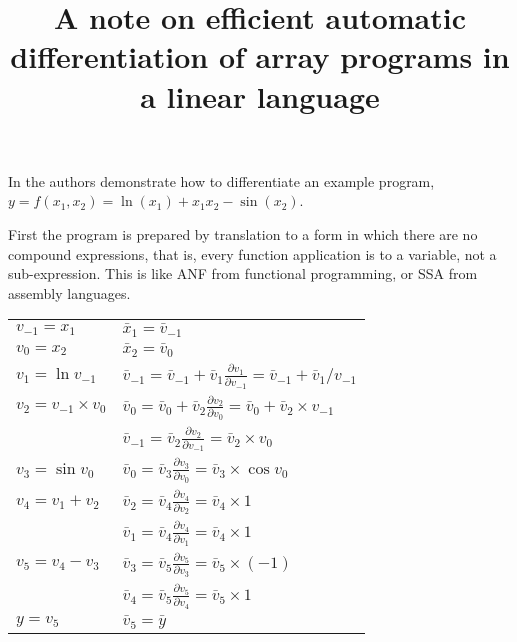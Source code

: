 \documentclass[12pt]{article}
\title{A note on efficient automatic differentiation of array programs
  in a linear language}
\begin{document}
\maketitle

In \cite{adml} the authors demonstrate how to differentiate an example
program, $y = f(x_1, x_2) = \ln(x_1)+x_1 x_2-\sin(x_2)$.

First the program is prepared by translation to a form in which there
are no compound expressions, that is, every function application is to
a variable, not a sub-expression.  This is like ANF from functional
programming, or SSA from assembly languages.

  \newcommand{\diff}[2]{
    \bar{v}_{#1} \frac{\partial v_{#1}}{\partial v_{#2}}
  }

\begin{tabular}[t]{ll}

  $v_{-1} = x_1$
  &
  $\bar{x}_1 = \bar{v}_{-1}$
  \\
  
  $v_{0} = x_2$
  &
  $\bar{x}_2 = \bar{v}_{0}$
  \\

  $v_1 = \ln{v_{-1}}$
  &
  \(\bar{v}_{-1}
  = \bar{v}_{-1} + \diff{1}{-1}
  = \bar{v}_{-1} + \bar{v}_1 / v_{-1}
  \) \\

  $v_2 = v_{-1} \times v_0$
  &
  \(\bar{v}_0
  = \bar{v}_0 + \diff{2}{0}
  = \bar{v}_0 + \bar{v}_2 \times v_{-1}
  \) \\

  &
  \(\bar{v}_{-1}
  = \diff{2}{-1}
  = \bar{v}_2 \times v_{0}
  \) \\

  $v_3 = \sin{v_0}$
  &
  \(\bar{v}_0
  = \diff{3}{0}
  = \bar{v}_3 \times \cos v_0
  \) \\

  $v_4 = v_1 + v_2$
  &
  \(\bar{v}_2
  = \diff{4}{2}
  = \bar{v}_4 \times 1
  \) \\

  &
  \(\bar{v}_1
  = \diff{4}{1}
  = \bar{v}_4 \times 1
  \) \\

  $v_5 = v_4 - v_3$
  &
  \(\bar{v}_3
  = \diff{5}{3}
  = \bar{v}_5 \times (-1)
  \) \\
  
  &
  \(\bar{v}_4
  = \diff{5}{4}
  = \bar{v}_5 \times 1
  \) \\
  
  $y = v_5$
  &
  $\bar{v}_5 = \bar{y}$
  \\

\end{tabular}
\end{document}
